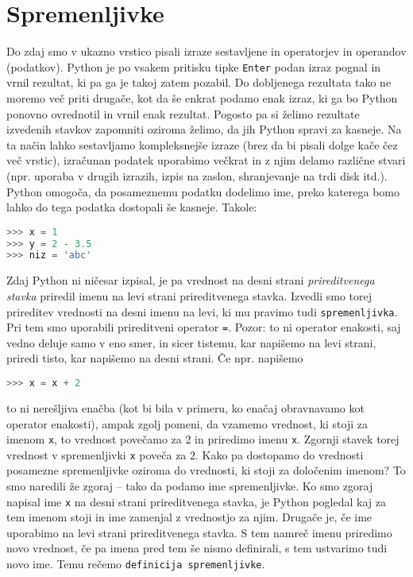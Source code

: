 \section{Spremenljivke}
Do zdaj smo v ukazno vrstico pisali izraze sestavljene in operatorjev in operandov (podatkov). Python je po vsakem pritisku tipke \texttt{Enter} podan izraz pognal in vrnil rezultat, ki pa ga je takoj zatem pozabil. Do dobljenega rezultata tako ne moremo več priti drugače, kot da še enkrat podamo enak izraz, ki ga bo Python ponovno ovrednotil in vrnil enak rezultat. Pogosto pa si želimo rezultate izvedenih stavkov zapomniti oziroma želimo, da jih Python spravi za kasneje. Na ta način lahko sestavljamo kompleksnejše izraze (brez da bi pisali dolge kače čez več vrstic), izračunan podatek uporabimo večkrat in z njim delamo različne stvari (npr. uporaba v drugih izrazih, izpis na zaslon, shranjevanje na trdi disk itd.). Python omogoča, da posameznemu podatku dodelimo ime, preko katerega bomo lahko do tega podatka dostopali še kasneje. Takole:
\begin{lstlisting}[language=Python, showstringspaces=false]
>>> x = 1
>>> y = 2 - 3.5
>>> niz = 'abc'
\end{lstlisting}
Zdaj Python ni ničesar izpisal, je pa vrednost na desni strani \emph{prireditvenega stavka} priredil imenu na levi strani prireditvenega stavka. Izvedli smo torej prireditev vrednosti na desni imenu na levi, ki mu pravimo tudi \texttt{spremenljivka}. Pri tem smo uporabili prireditveni operator \texttt{=}. Pozor: to ni operator enakosti, saj vedno deluje samo v eno smer, in sicer tistemu, kar napišemo na levi strani, priredi tisto, kar napišemo na desni strani. Če npr. napišemo
\begin{lstlisting}[language=Python, showstringspaces=false]
>>> x = x + 2
\end{lstlisting}
to ni nerešljiva enačba (kot bi bila v primeru, ko enačaj obravnavamo kot operator enakosti), ampak zgolj pomeni, da vzamemo vrednost, ki stoji za imenom \texttt{x}, to vrednost povečamo za 2 in priredimo imenu \texttt{x}. Zgornji stavek torej vrednost v spremenljivki \texttt{x} poveča za 2. Kako pa dostopamo do vrednosti posamezne spremenljivke oziroma do vrednosti, ki stoji za določenim imenom? To smo naredili že zgoraj -- tako da podamo ime spremenljivke. Ko smo zgoraj napisal ime \texttt{x} na desni strani prireditvenega stavka, je Python pogledal kaj za tem imenom stoji in ime zamenjal z vrednostjo za njim. Drugače je, če ime uporabimo na levi strani prireditvenega stavka. S tem namreč imenu priredimo novo vrednost, če pa imena pred tem še nismo definirali, s tem ustvarimo tudi novo ime. Temu rečemo \texttt{definicija spremenljivke}.

